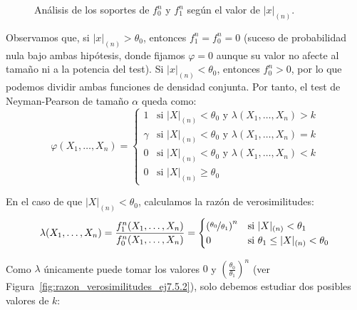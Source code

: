 \begin{ejercicio}
\begin{description}
\begin{figure}[h]
            \caption{Análisis de los soportes de $f_0^n$ y $f_1^n$ según el valor de $|x|_{(n)}$.}
            \label{fig:densidades_conjuntas_ej7.5.2}
        \end{figure}

        Observamos que, si $|x|_{(n)} > \theta_0$, entonces $f_1^n=f_0^n=0$ (suceso de probabilidad nula bajo ambas hipótesis, donde fijamos $\varphi=0$ aunque su valor no afecte al tamaño ni a la potencia del test). Si $|x|_{(n)} < \theta_0$, entonces $f_0^n>0$, por lo que podemos dividir ambas funciones de densidad conjunta. Por tanto, el test de Neyman-Pearson de tamaño $\alpha$ queda como:
        \begin{equation*}
            \varphi(X_1, \ldots, X_n) = \left\{\begin{array}{ll}
                1 & \text{si\ } |X|_{(n)} < \theta_0 \text{\ y\ } \lambda(X_1, \ldots, X_n) > k \\
                \gamma & \text{si\ } |X|_{(n)} < \theta_0 \text{\ y\ } \lambda(X_1, \ldots, X_n) = k \\
                0 & \text{si\ } |X|_{(n)} < \theta_0 \text{\ y\ } \lambda(X_1, \ldots, X_n) < k\\
                0 & \text{si\ } |X|_{(n)} \geq \theta_0
            \end{array}\right.
        \end{equation*}

        En el caso de que $|X|_{(n)} < \theta_0$, calculamos la razón de verosimilitudes:
        \begin{equation*}
            \lambda(X_1, \ldots, X_n) = \frac{f_1^n(X_1, \ldots, X_n)}{f_0^n(X_1, \ldots, X_n)} = \begin{cases}
                \left(\nicefrac{\theta_0}{\theta_1}\right)^n & \text{si\ } |X|_{(n)} < \theta_1 \\
                0 & \text{si\ } \theta_1 \leq |X|_{(n)} < \theta_0
            \end{cases}
        \end{equation*}

        Como $\lambda$ únicamente puede tomar los valores $0$ y $\left(\frac{\theta_0}{\theta_1}\right)^n$ (ver Figura~\ref{fig:razon_verosimilitudes_ej7.5.2}), solo debemos estudiar dos posibles valores de $k$:
        \begin{figure}[h]
            \centering
\end{figure}
\end{description}
\end{ejercicio}
